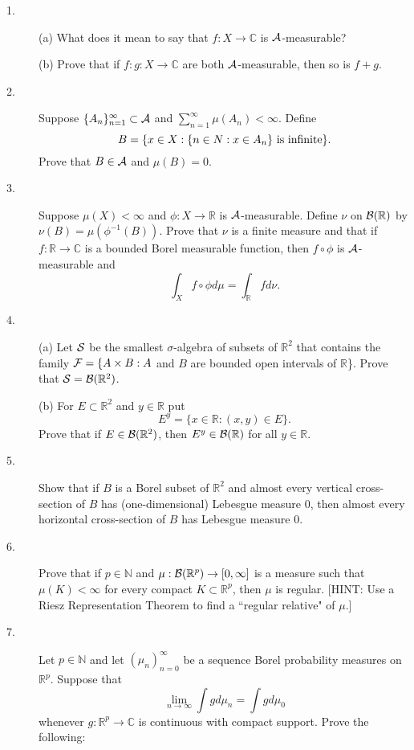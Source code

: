 \documentclass{article}
\def\R{\mathbb R}
\def\C{\mathbb C}
\def\N{\mathbb N}
\begin{document}
\begin{description}
\item[1.] (a)
What does it mean to say that $f:X \to \C$ is ${\cal A}$-measurable?

\item[\quad] (b)
Prove that if $f:g : X \to \C$ are both ${\cal A}$-measurable, then so is
$f+g$.

\item[2.]
Suppose $\{A_n\}^\infty_{n=1} \subset {\cal A}$ and
$\sum^\infty_{n=1} \mu(A_n) < \infty$. Define
$$B=\{x \in X: \{n \in N : x \in A_n\} \hbox{\ is\ } \hbox{infinite}\}.$$
Prove that $B\in {\cal A}$ and $\mu(B) = 0$.

\item[3.]
Suppose $\mu(X) < \infty$ and $\phi : X \to \R$ is ${\cal A}$-measurable.
Define $\nu$ on ${\cal B}(\R)$ by $\nu
(B) = \mu(\phi^{-1} (B))$. Prove that
$\nu$ is a finite measure and that if $f:\R \to \C$ is a bounded
Borel measurable function, then $f \circ \phi$ is ${\cal A}$-measurable and
$$\int_X f \circ \phi d\mu = \int_\R fd\nu.$$

\item[4.] (a)
Let ${\cal S}$ be the smallest $\sigma$-algebra of subsets of $\R^2$ that
contains the family ${\cal F} = \{ A \times B : A$ and $B$ are bounded open
intervals of $\R$\}. Prove that ${\cal S} = {\cal B} (\R^2)$.

\item[\quad] (b)
For $E \subset \R^2$ and $y \in \R$ put
$$E^y = \{x \in \R: (x,y) \in E\}.$$
Prove that if $E \in {\cal B} (\R^2)$, then $E^y \in {\cal B} (\R)$ for all
$y \in \R$.

\item[5.]
Show that if $B$ is a Borel subset of $\R^2$ and almost every vertical
cross-section of $B$ has (one-dimensional) Lebesgue measure 0, then almost
every horizontal cross-section of $B$ has Lebesgue measure 0.

\item[6.]
Prove that if $p \in \N$ and $\mu : {\cal B}(\R^p) \to [0,\infty]$ is a
measure such that $\mu (K) < \infty$ for every compact $K \subset \R^p$, then
$\mu$ is regular. [HINT: Use a Riesz Representation Theorem to find a
``regular relative" of $\mu$.]

\item[7.]
Let $p \in \N$ and let $(\mu_n)^\infty_{n=0}$ be a sequence Borel probability
measures on $\R^p$. Suppose that
$$\lim_{n\to \infty} \int gd\mu_n = \int g d \mu_0$$
whenever $g: \R^p \to \C$ is continuous with compact support. Prove the
following:


\end{description}
\end{document}
